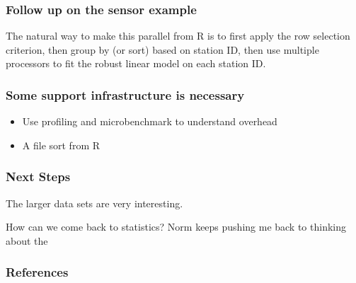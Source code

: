 \documentclass{beamer}
\begin{document}
\begin{frame}

    \frametitle{Follow up on the sensor example}

    The natural way to make this parallel from R is to first apply the
    row selection criterion, then group by (or
    sort) based on station ID, then use multiple processors to fit the
    robust linear model on each station ID.

\end{frame}
\begin{frame}

    \frametitle{Some support infrastructure is necessary}

\begin{itemize}
\item Use profiling and microbenchmark to understand overhead
\item A file sort from R
\end{itemize}


\end{frame}
\begin{frame}

    \frametitle{Next Steps}

    The larger data sets are very interesting. 
    
    How can we come back
    to statistics? Norm keeps pushing me back to thinking about the 



\end{frame}
\begin{frame}
\frametitle{References}
\printbibliography
\end{frame}
\end{document}
